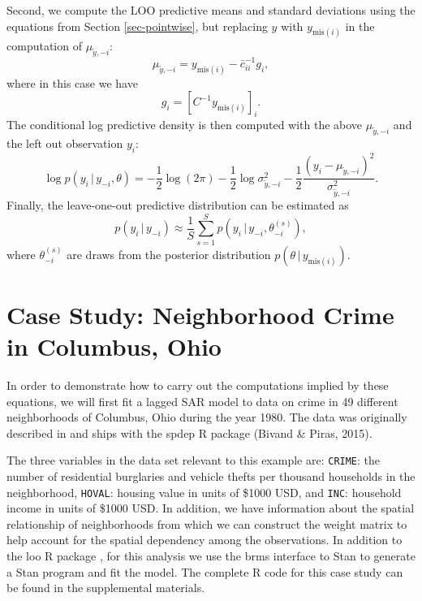 \documentclass[11pt]{article}
\begin{document}
Second, we compute the LOO predictive means and standard deviations using the
equations from Section \ref{sec-pointwise}, but replacing $y$ with
$y_{\mathrm{mis}(i)}$ in the computation of $\mu_{\tilde{y},-i}$:
%
\begin{equation}
\mu_{\tilde{y},-i} = y_{{\mathrm{mis}}(i)}-\bar{c}_{ii}^{-1}g_i,
\end{equation}
%
where in this case we have
%
\begin{equation}
g_i = \left[ C^{-1} y_{\mathrm{mis}(i)} \right]_i.
\end{equation}
%
The conditional log predictive density is then computed with the above
$\mu_{\tilde{y},-i}$ and the left out observation $y_i$:
%
\begin{equation}
  \log p(y_i\,|\,y_{-i},\theta)
  = - \frac{1}{2}\log(2\pi)
  - \frac{1}{2}\log \sigma^2_{\tilde{y},-i}
  - \frac{1}{2}\frac{(y_i-\mu_{\tilde{y},-i})^2}{\sigma^2_{\tilde{y},-i}}.
\end{equation}
%
Finally, the leave-one-out predictive distribution can be estimated as
%
\begin{equation}
 p(y_i\,|\,y_{-i}) \approx \frac{1}{S} \sum_{s=1}^S p(y_i\,|\,y_{-i}, \theta_{-i}^{(s)}),
\end{equation}
%
where $\theta_{-i}^{(s)}$ are draws from the posterior distribution
$p(\theta\,|\,y_{\mathrm{mis}(i)})$.


\section{Case Study: Neighborhood Crime in Columbus, Ohio}
\label{case-study}

In order to demonstrate how to carry out the computations implied by
these equations, we will first fit a lagged SAR model to data on crime
in 49 different neighborhoods of Columbus, Ohio during the year 1980.
The data was originally described in \cite{anselin1988} and ships with the
spdep R package (Bivand \& Piras, 2015).

The three variables in the data set relevant to
this example are: \texttt{CRIME}: the number of residential burglaries
and vehicle thefts per thousand households in the neighborhood,
\texttt{HOVAL}: housing value in units of \$1000 USD, and \texttt{INC}:
household income in units of \$1000 USD. In addition, we have information
about the spatial relationship of neighborhoods from which we can
construct the weight matrix to help account for the spatial
dependency among the observations. 
In addition to the loo R package \citep{loo2018}, for
this analysis we use the brms interface \citep{brms1} to Stan
\citep{carpenter2017} to generate a Stan program and fit the model.
The complete R code for this case study can be found in the supplemental materials.
\end{document}
